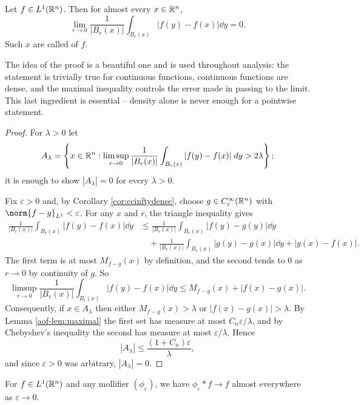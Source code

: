 \documentclass[a4paper]{scrartcl}
\begin{document}
\begin{theorem}\label{thm:lebdiff}
	Let $f \in L^1(\mathbb{R}^n)$. Then for almost every $x \in \mathbb{R}^n$,
	$$\lim_{r \to 0} \frac{1}{|B_r(x)|} \int_{B_r(x)} |f(y) - f(x)| \dd y = 0.$$
	Such $x$ are called  of $f$.
\end{theorem}

The idea of the proof is a beautiful one and is used throughout analysis: the statement is trivially true for continuous functions, continuous functions are dense, and the maximal inequality controls the error made in passing to the limit. This last ingredient is essential -- density alone is never enough for a pointwise statement.

\begin{proof}
	For $\lambda > 0$ let
	$$A_\lambda = \left\{ x \in \mathbb{R}^n : \limsup_{r \to 0}\frac{1}{|B_r(x)|}\int_{B_r(x)}|f(y)-f(x)| \; d y > 2\lambda \right\};$$
	it is enough to show $|A_\lambda| = 0$ for every $\lambda > 0$.

	Fix $\varepsilon > 0$ and, by Corollary \ref{cor:ccinftydense}, choose $g \in C_c^\infty(\mathbb{R}^n)$ with $\norm{f - g}_{L^1} < \varepsilon$. For any $x$ and $r$, the triangle inequality gives
	\begin{align*}
		\frac{1}{|B_r(x)|}\int_{B_r(x)}|f(y) - f(x)| \dd y &\le \frac{1}{|B_r(x)|}\int_{B_r(x)}|f(y) - g(y)|\dd y \\
		&\quad + \frac{1}{|B_r(x)|}\int_{B_r(x)}|g(y) - g(x)| \dd y + |g(x) - f(x)|.
	\end{align*}
	The first term is at most $M_{f-g}(x)$ by definition, and the second tends to $0$ as $r \to 0$ by continuity of $g$. So
	$$\limsup_{r \to 0}\frac{1}{|B_r(x)|}\int_{B_r(x)}|f(y)-f(x)|\dd y \le M_{f-g}(x) + |f(x) - g(x)|.$$
	Consequently, if $x \in A_\lambda$ then either $M_{f-g}(x) > \lambda$ or $|f(x)-g(x)| > \lambda$. By Lemma \ref{aof-lem:maximal} the first set has measure at most $C_n \varepsilon/\lambda$, and by Chebyshev's inequality the second has measure at most $\varepsilon/\lambda$. Hence
	$$|A_\lambda| \le \frac{(1 + C_n)\varepsilon}{\lambda},$$
	and since $\varepsilon > 0$ was arbitrary, $|A_\lambda| = 0$.
\end{proof}

\begin{corollary}
	For $f \in L^1(\mathbb{R}^n)$ and any mollifier $(\phi_\varepsilon)$, we have $\phi_\varepsilon * f \to f$ almost everywhere as $\varepsilon \to 0$.
\end{corollary}
\end{document}
